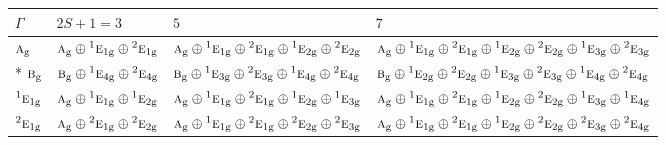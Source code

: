 \documentclass[10pt,a4paper]{article}
\numberwithin{equation}{section}
\newcommand{\irr}[1]{\text{\normalfont\scshape #1}}
\newcommand{\conjpair}[1]{{}^{#1}}
\newcommand{\ptag}[1]{\mathrm{#1}}
\begin{document}
{\small\setlength{\tabcolsep}{3pt}\begin{longtable}{@{}l>{\RaggedRight\arraybackslash}p{}>{\RaggedRight\arraybackslash}p{}>{\RaggedRight\arraybackslash}p{}@{}}\toprule
$\Gamma$ & $2S + 1 = 3$ & $5$ & $7$\\\midrule\endhead
\bottomrule\endfoot\endlastfoot
$\irr{a}_{\ptag{g}}$ & $\irr{a}_{\ptag{g}}\oplus \conjpair{1}\irr{e}_{1\ptag{g}}\oplus \conjpair{2}\irr{e}_{1\ptag{g}}$ & $\irr{a}_{\ptag{g}}\oplus \conjpair{1}\irr{e}_{1\ptag{g}}\oplus \conjpair{2}\irr{e}_{1\ptag{g}}\oplus \conjpair{1}\irr{e}_{2\ptag{g}}\oplus \conjpair{2}\irr{e}_{2\ptag{g}}$ & $\irr{a}_{\ptag{g}}\oplus \conjpair{1}\irr{e}_{1\ptag{g}}\oplus \conjpair{2}\irr{e}_{1\ptag{g}}\oplus \conjpair{1}\irr{e}_{2\ptag{g}}\oplus \conjpair{2}\irr{e}_{2\ptag{g}}\oplus \conjpair{1}\irr{e}_{3\ptag{g}}\oplus \conjpair{2}\irr{e}_{3\ptag{g}}$\\*
$\irr{b}_{\ptag{g}}$ & $\irr{b}_{\ptag{g}}\oplus \conjpair{1}\irr{e}_{4\ptag{g}}\oplus \conjpair{2}\irr{e}_{4\ptag{g}}$ & $\irr{b}_{\ptag{g}}\oplus \conjpair{1}\irr{e}_{3\ptag{g}}\oplus \conjpair{2}\irr{e}_{3\ptag{g}}\oplus \conjpair{1}\irr{e}_{4\ptag{g}}\oplus \conjpair{2}\irr{e}_{4\ptag{g}}$ & $\irr{b}_{\ptag{g}}\oplus \conjpair{1}\irr{e}_{2\ptag{g}}\oplus \conjpair{2}\irr{e}_{2\ptag{g}}\oplus \conjpair{1}\irr{e}_{3\ptag{g}}\oplus \conjpair{2}\irr{e}_{3\ptag{g}}\oplus \conjpair{1}\irr{e}_{4\ptag{g}}\oplus \conjpair{2}\irr{e}_{4\ptag{g}}$\\
$\conjpair{1}\irr{e}_{1\ptag{g}}$ & $\irr{a}_{\ptag{g}}\oplus \conjpair{1}\irr{e}_{1\ptag{g}}\oplus \conjpair{1}\irr{e}_{2\ptag{g}}$ & $\irr{a}_{\ptag{g}}\oplus \conjpair{1}\irr{e}_{1\ptag{g}}\oplus \conjpair{2}\irr{e}_{1\ptag{g}}\oplus \conjpair{1}\irr{e}_{2\ptag{g}}\oplus \conjpair{1}\irr{e}_{3\ptag{g}}$ & $\irr{a}_{\ptag{g}}\oplus \conjpair{1}\irr{e}_{1\ptag{g}}\oplus \conjpair{2}\irr{e}_{1\ptag{g}}\oplus \conjpair{1}\irr{e}_{2\ptag{g}}\oplus \conjpair{2}\irr{e}_{2\ptag{g}}\oplus \conjpair{1}\irr{e}_{3\ptag{g}}\oplus \conjpair{1}\irr{e}_{4\ptag{g}}$\\
$\conjpair{2}\irr{e}_{1\ptag{g}}$ & $\irr{a}_{\ptag{g}}\oplus \conjpair{2}\irr{e}_{1\ptag{g}}\oplus \conjpair{2}\irr{e}_{2\ptag{g}}$ & $\irr{a}_{\ptag{g}}\oplus \conjpair{1}\irr{e}_{1\ptag{g}}\oplus \conjpair{2}\irr{e}_{1\ptag{g}}\oplus \conjpair{2}\irr{e}_{2\ptag{g}}\oplus \conjpair{2}\irr{e}_{3\ptag{g}}$ & $\irr{a}_{\ptag{g}}\oplus \conjpair{1}\irr{e}_{1\ptag{g}}\oplus \conjpair{2}\irr{e}_{1\ptag{g}}\oplus \conjpair{1}\irr{e}_{2\ptag{g}}\oplus \conjpair{2}\irr{e}_{2\ptag{g}}\oplus \conjpair{2}\irr{e}_{3\ptag{g}}\oplus \conjpair{2}\irr{e}_{4\ptag{g}}$\\

\end{longtable}}
\end{document}
